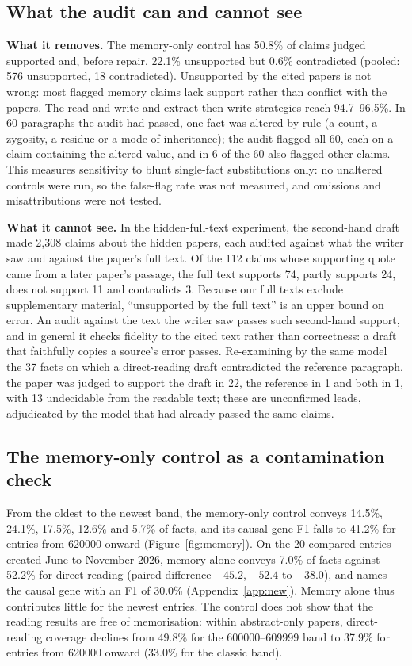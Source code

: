 \documentclass{article} %
\begin{document}
\subsection{What the audit can and cannot see}
\label{sec:audit}
\textbf{What it removes.} The memory-only control has 50.8\% of claims judged supported and, before repair, 22.1\% unsupported but 0.6\% contradicted (pooled: 576 unsupported, 18 contradicted). Unsupported by the cited papers is not wrong: most flagged memory claims lack support rather than conflict with the papers. The read-and-write and extract-then-write strategies reach 94.7--96.5\%. In 60 paragraphs the audit had passed, one fact was altered by rule (a count, a zygosity, a residue or a mode of inheritance); the audit flagged all 60, each on a claim containing the altered value, and in 6 of the 60 also flagged other claims. This measures sensitivity to blunt single-fact substitutions only: no unaltered controls were run, so the false-flag rate was not measured, and omissions and misattributions were not tested.


\textbf{What it cannot see.} In the hidden-full-text experiment, the second-hand draft made 2,308 claims about the hidden papers, each audited against what the writer saw and against the paper's full text. Of the 112 claims whose supporting quote came from a later paper's passage, the full text supports 74, partly supports 24, does not support 11 and contradicts 3. Because our full texts exclude supplementary material, ``unsupported by the full text'' is an upper bound on error. An audit against the text the writer saw passes such second-hand support, and in general it checks fidelity to the cited text rather than correctness: a draft that faithfully copies a source's error passes. Re-examining by the same model the 37 facts on which a direct-reading draft contradicted the reference paragraph, the paper was judged to support the draft in 22, the reference in 1 and both in 1, with 13 undecidable from the readable text; these are unconfirmed leads, adjudicated by the model that had already passed the same claims.

\subsection{The memory-only control as a contamination check}
\label{sec:memory}
From the oldest to the newest band, the memory-only control conveys 14.5\%, 24.1\%, 17.5\%, 12.6\% and 5.7\% of facts, and its causal-gene F1 falls to 41.2\% for entries from 620000 onward (Figure~\ref{fig:memory}). On the 20 compared entries created June to November 2026, memory alone conveys 7.0\% of facts against 52.2\% for direct reading (paired difference $-45.2$, $-52.4$ to $-38.0$), and names the causal gene with an F1 of 30.0\% (Appendix~\ref{app:new}). Memory alone thus contributes little for the newest entries. The control does not show that the reading results are free of memorisation: within abstract-only papers, direct-reading coverage declines from 49.8\% for the 600000--609999 band to 37.9\% for entries from 620000 onward (33.0\% for the classic band).
\end{document}
